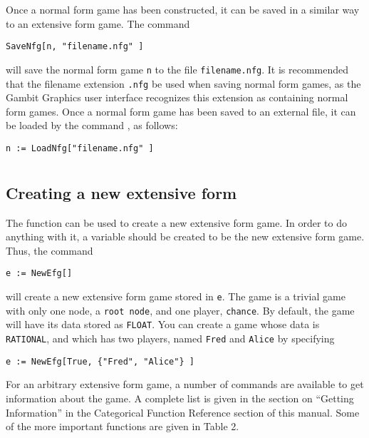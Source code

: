 Once a normal form game has been constructed, it can be saved in a
similar way to an extensive form game.  The command 

\begin{verbatim}
SaveNfg[n, "filename.nfg" ]
\end{verbatim}

\noindent
will save the normal form game \verb+n+ to the file
\verb+filename.nfg+.  It is recommended that the filename extension
\verb+.nfg+ be used when saving normal form games, as the Gambit
Graphics user interface recognizes this extension as containing normal
form games.  Once a normal form game has been saved to an external
file, it can be loaded by the command , as follows:

\begin{verbatim}
n := LoadNfg["filename.nfg" ]
\end{verbatim}



\section{}

\subsection{Creating a new extensive form}

The function  can be used to create a new extensive form
game.  In order to do anything with it, a variable should be created
to be the new extensive form game.  Thus, the command

\begin{verbatim}
e := NewEfg[]
\end{verbatim}

\noindent will create a new extensive form game stored in \verb+e+.
The game is a trivial game with only one node, a \verb+root node+, and
one player, \verb+chance+.  By default, the game will have its data
stored as \verb+FLOAT+.  You can create a game whose data is
\verb+RATIONAL+, and which has two players, named \verb+Fred+ and
\verb+Alice+ by specifying


\begin{verbatim}
e := NewEfg[True, {"Fred", "Alice"} ]
\end{verbatim}

For an arbitrary extensive form game, a number of commands are
available to get information about the game.  A complete list is given
in the section on ``Getting Information'' in the Categorical Function
Reference section of this manual.  Some of the more important
functions are given in Table 2.  

